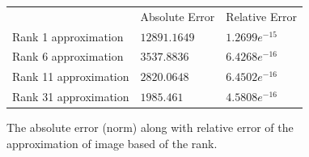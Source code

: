 \begin{figure}[]
 \centering    
\begin{tabular}{ |p{5cm}|| p{3cm}|p{3cm}|}
 \hline
 & Absolute Error &  Relative Error \\ \hhline{|=|=|=|}
 \hline
 Rank 1 approximation  & $12891.1649$ & $1.2699e^{-15}$    \\
 Rank 6 approximation  & $3537.8836$  & $6.4268e^{-16}$   \\
 Rank 11 approximation & $2820.0648$  & $6.4502e^{-16}$   \\
 Rank 31 approximation & $1985.461 $  & $4.5808e^{-16}$   \\
 \hline
\end{tabular} 
\caption{The absolute error (norm) along with relative error of the approximation of  image based of the rank.}
   \label{tab:error}
\end{figure} 